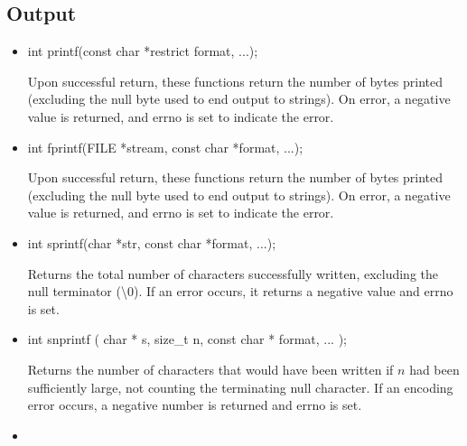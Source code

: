 \documentclass{report}
\begin{document}
    \subsection{Output}
    \begin{itemize}
        \item \bigbreak \noindent 
            \begin{cppcode}
                int printf(const char *restrict format, ...);
            \end{cppcode}
            \bigbreak \noindent 
            Upon successful return, these functions return the number of bytes printed (excluding the null byte used to end output to strings).
            \bigbreak \noindent 
            On error, a negative value is returned, and errno is set to indicate the error.
        \item \bigbreak \noindent 
            \begin{cppcode}
                int fprintf(FILE *stream, const char *format, ...);
            \end{cppcode}
            \bigbreak \noindent 
            Upon successful return, these functions return the number of bytes printed (excluding the null byte used to end output to strings).
            \bigbreak \noindent 
            On error, a negative value is returned, and errno is set to indicate the error.
        \item \bigbreak \noindent 
            \begin{cppcode}
                int sprintf(char *str, const char *format, ...); 
            \end{cppcode}
            \bigbreak \noindent 
            Returns the total number of characters successfully written, excluding the null terminator (\textbackslash0). 
            \bigbreak \noindent 
            If an error occurs, it returns a negative value and errno is set.
        \item \bigbreak \noindent 
            \begin{cppcode}
                int snprintf ( char * s, size_t n, const char * format, ... );
            \end{cppcode}
            \bigbreak \noindent 
            Returns the number of characters that would have been written if $n$ had been sufficiently large, not counting the terminating null character. 
            \bigbreak \noindent 
            If an encoding error occurs, a negative number is returned and errno is set.
        \item \bigbreak \noindent \begin{cppcode}

\end{cppcode}
\end{itemize}
\end{document}
